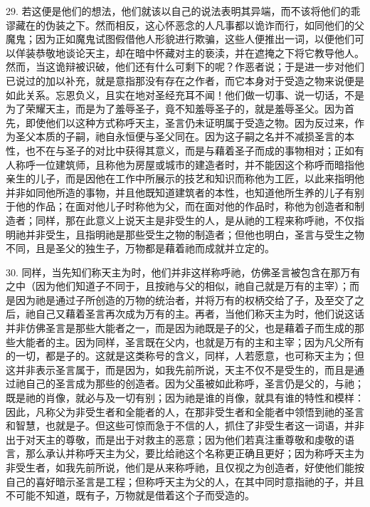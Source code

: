 29. 若这便是他们的想法，他们就该以自己的说法表明其异端，而不该将他们的乖谬藏在的伪装之下。然而相反，这心怀恶念的人凡事都以诡诈而行，如同他们的父魔鬼；因为正如魔鬼试图假借他人形貌进行欺骗，这些人便推出一词，以便他们可以佯装恭敬地谈论天主，却在暗中怀藏对主的亵渎，并在遮掩之下将它教导他人。然而，当这诡辩被识破，他们还有什么可剩下的呢？作恶者说；于是进一步对他们已说过的加以补充，就是意指那没有存在之作者，而它本身对于受造之物来说便是如此关系。忘恩负义，且实在地对圣经充耳不闻！他们做一切事、说一切话，不是为了荣耀天主，而是为了羞辱圣子，竟不知羞辱圣子的，就是羞辱圣父。因为首先，即使他们以这种方式称呼天主，圣言仍未证明属于受造之物。因为反过来，作为圣父本质的子嗣，祂自永恒便与圣父同在。因为这子嗣之名并不减损圣言的本性，也不在与圣子的对比中获得其意义，而是与藉着圣子而成的事物相对；正如有人称呼一位建筑师，且称他为房屋或城市的建造者时，并不能因这个称呼而暗指他亲生的儿子，而是因他在工作中所展示的技艺和知识而称他为工匠，以此来指明他并非如同他所造的事物，并且他既知道建筑者的本性，也知道他所生养的儿子有别于他的作品；在面对他儿子时称他为父，而在面对他的作品时，称他为创造者和制造者；同样，那在此意义上说天主是非受生的人，是从祂的工程来称呼祂，不仅指明祂并非受生，且指明祂是那些受生之物的制造者；但他也明白，圣言与受生之物不同，且是圣父的独生子，万物都是藉着祂而成就并立定的。\par

30. 同样，当先知们称天主为时，他们并非这样称呼祂，仿佛圣言被包含在那万有之中（因为他们知道子不同于，且按祂与父的相似，祂自己就是万有的主宰）；而是因为祂是通过子所创造的万物的统治者，并将万有的权柄交给了子，及至交了之后，祂自己又藉着圣言再次成为万有的主。再者，当他们称天主为时，他们说这话并非仿佛圣言是那些大能者之一，而是因为祂既是子的父，也是藉着子而生成的那些大能者的主。因为同样，圣言既在父内，也就是万有的主和主宰；因为凡父所有的一切，都是子的。这就是这类称号的含义，同样，人若愿意，也可称天主为；但这并非表示圣言属于，而是因为，如我先前所说，天主不仅不是受生的，而且是通过祂自己的圣言成为那些的创造者。因为父虽被如此称呼，圣言仍是父的，与祂；既是祂的肖像，就必与及一切有别；因为祂是谁的肖像，就具有谁的特性和模样：因此，凡称父为非受生者和全能者的人，在那非受生者和全能者中领悟到祂的圣言和智慧，也就是子。但这些可惊而急于不信的人，抓住了非受生者这一词语，并非出于对天主的尊敬，而是出于对救主的恶意；因为他们若真注重尊敬和虔敬的语言，那么承认并称呼天主为父，要比给祂这个名称更正确且更好；因为称呼天主为非受生者，如我先前所说，他们是从来称呼祂，且仅视之为创造者，好使他们能按自己的喜好暗示圣言是工程；但称呼天主为父的人，在其中同时意指祂的子，并且不可能不知道，既有子，万物就是借着这个子而受造的。\par

